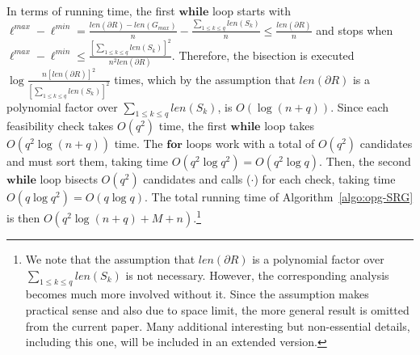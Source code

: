 \begin{algorithm}
\begin{small}
		\vspace{0.025in}
		
		\caption{\algoSRG} \label{algo:opg-SRG}
	\end{small}
\end{algorithm}
\vspace*{-3mm}

In terms of running time, the first $\mathbf{while}$ loop starts with 
$\ell^{max} - \ell^{min} = \frac{len(\partial R) -  len(G_{max})}{n} -
\frac{\sum_{1\le k\le q}len(S_k)}{n} \le \frac{len(\partial R)}{n}$ and 
stops when $\ell^{max} - \ell^{min} \le 
\frac{[\sum_{1\le k\le q}len(S_k)]^2}{n^2len(\partial R)}$. Therefore, 
the bisection is executed 
$\log \frac{n[len(\partial R)]^2}{[\sum_{1\le k\le q}len(S_k)]^2}$ times, 
which by the assumption that $len(\partial R)$ is a polynomial factor over 
$\sum_{1\le k\le q}len(S_k)$, is $O(\log (n + q))$. Since each feasibility 
check takes $O(q^2)$ time, the first $\mathbf{while}$ loop takes 
$O(q^2\log(n + q))$ time. The $\mathbf{for}$ loops work with a total of 
$O(q^2)$ candidates and must sort them, taking time $O(q^2 \log q^2) = 
O(q^2 \log q)$. Then, the second $\mathbf{while}$ loop bisects $O(q^2)$ 
candidates and calls \isLFeasibleByTilingPartial($\cdot$) for each check, 
taking time $O(q\log q^2) = O(q\log q)$. The total running time of 
Algorithm~\ref{algo:opg-SRG} is then $O(q^2\log (n + q) + M + n)$.\footnote{We note that 
the assumption that $len(\partial R)$ is a polynomial factor over 
$\sum_{1\le k\le q}len(S_k)$ is not necessary. However, the corresponding 
analysis becomes much more involved without it. Since the assumption makes 
practical sense and also due to space limit, the more general result is 
omitted from the current paper. Many additional interesting but 
non-essential details, including this one, will be included in an extended 
version.}
